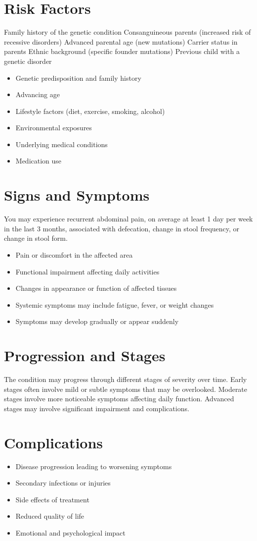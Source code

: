 \section{Risk Factors}
Family history of the genetic condition Consanguineous parents (increased risk of recessive disorders) Advanced parental age (new mutations) Carrier status in parents Ethnic background (specific founder mutations) Previous child with a genetic disorder

\begin{itemize}[noitemsep]
  \item Genetic predisposition and family history
  \item Advancing age
  \item Lifestyle factors (diet, exercise, smoking, alcohol)
  \item Environmental exposures
  \item Underlying medical conditions
  \item Medication use
\end{itemize}
\section{Signs and Symptoms}
You may experience recurrent abdominal pain, on average at least 1 day per week in the last 3 months, associated with defecation, change in stool frequency, or change in stool form.

\begin{itemize}[noitemsep]
  \item Pain or discomfort in the affected area
  \item Functional impairment affecting daily activities
  \item Changes in appearance or function of affected tissues
  \item Systemic symptoms may include fatigue, fever, or weight changes
  \item Symptoms may develop gradually or appear suddenly
\end{itemize}
\section{Progression and Stages}
The condition may progress through different stages of severity over time. Early stages often involve mild or subtle symptoms that may be overlooked. Moderate stages involve more noticeable symptoms affecting daily function. Advanced stages may involve significant impairment and complications.
\section{Complications}
\begin{itemize}[noitemsep]
  \item Disease progression leading to worsening symptoms
  \item Secondary infections or injuries
  \item Side effects of treatment
  \item Reduced quality of life
  \item Emotional and psychological impact
\end{itemize}
